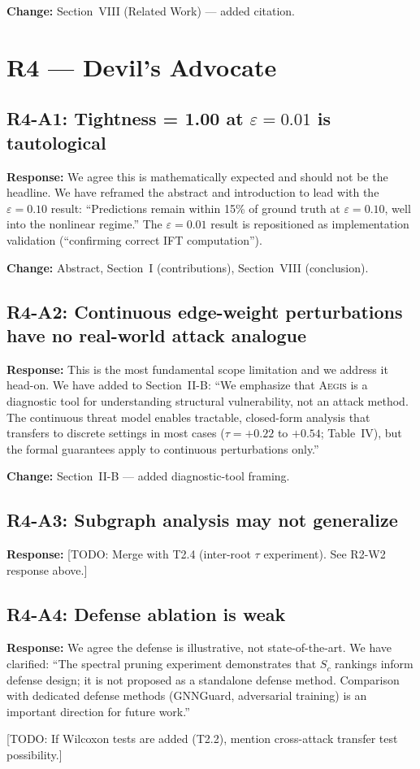 \documentclass[11pt]{article}
\newcommand{\reviewer}[1]{\subsection*{\textcolor{revcolor}{#1}}}
\newcommand{\response}[1]{\textcolor{responsecolor}{\textbf{Response:} #1}}
\newcommand{\change}[1]{\textcolor{changecolor}{\textbf{Change:} #1}}
\newcommand{\AEGIS}{\textsc{Aegis}}
\begin{document}
\change{Section~VIII (Related Work) --- added citation.}

\section*{R4 --- Devil's Advocate}

\reviewer{R4-A1: Tightness = 1.00 at $\varepsilon = 0.01$ is tautological}

\response{
We agree this is mathematically expected and should not be the headline. We have reframed the abstract and introduction to lead with the $\varepsilon = 0.10$ result: ``Predictions remain within 15\% of ground truth at $\varepsilon = 0.10$, well into the nonlinear regime.'' The $\varepsilon = 0.01$ result is repositioned as implementation validation (``confirming correct IFT computation'').
}

\change{Abstract, Section~I (contributions), Section~VIII (conclusion).}


\reviewer{R4-A2: Continuous edge-weight perturbations have no real-world attack analogue}

\response{
This is the most fundamental scope limitation and we address it head-on. We have added to Section~II-B: ``We emphasize that \AEGIS{} is a diagnostic tool for understanding structural vulnerability, not an attack method. The continuous threat model enables tractable, closed-form analysis that transfers to discrete settings in most cases ($\tau = +0.22$ to $+0.54$; Table~IV), but the formal guarantees apply to continuous perturbations only.''
}

\change{Section~II-B --- added diagnostic-tool framing.}


\reviewer{R4-A3: Subgraph analysis may not generalize}

\response{[TODO: Merge with T2.4 (inter-root $\tau$ experiment). See R2-W2 response above.]}


\reviewer{R4-A4: Defense ablation is weak}

\response{
We agree the defense is illustrative, not state-of-the-art. We have clarified: ``The spectral pruning experiment demonstrates that $S_c$ rankings inform defense design; it is not proposed as a standalone defense method. Comparison with dedicated defense methods (GNNGuard, adversarial training) is an important direction for future work.''

[TODO: If Wilcoxon tests are added (T2.2), mention cross-attack transfer test possibility.]
}
\end{document}
